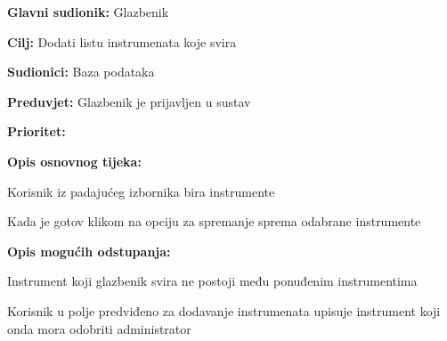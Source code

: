 \noindent {}
	\begin{packed_item}
		
		\item \textbf{Glavni sudionik: } Glazbenik
		\item \textbf{Cilj:} Dodati listu instrumenata koje svira
		\item \textbf{Sudionici:} Baza podataka
		\item \textbf{Preduvjet:} Glazbenik je prijavljen u sustav
		\item \textbf{Prioritet:} 
		\item \textbf{Opis osnovnog tijeka:}
		
		\item[] \begin{packed_enum}
			\item Korisnik iz padajućeg izbornika bira instrumente
			\item Kada je gotov klikom na opciju za spremanje sprema odabrane instrumente 
		\end{packed_enum}
		
		\item  \textbf{Opis mogućih odstupanja:}
		
		\item[] \begin{packed_item}
			
			\item[1.a] Instrument koji glazbenik svira ne postoji među ponuđenim instrumentima
			\item[] \begin{packed_enum}
				
				\item Korisnik u polje predviđeno za dodavanje instrumenata upisuje instrument koji onda mora odobriti administrator
				
			\end{packed_enum}	
		\end{packed_item}
	\end{packed_item}


